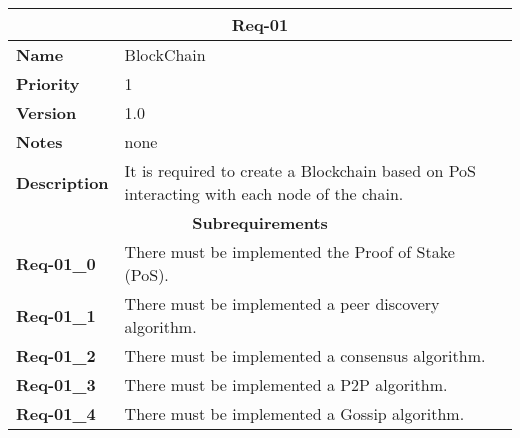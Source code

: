 \documentclass[../documentation.tex]{subfiles}
\begin{document}
\bgroup{}
\def\arraystretch{1.25}
\begin{center}
    \begin{tabular}{ |l|p{9cm}| }
        \hline
        \multicolumn{2}{|c|}{\textbf{Req-01}} \\
        \hline
        \textbf{Name} & BlockChain \\
        \hline
        \textbf{Priority} & 1 \\
        \hline
        \textbf{Version} & 1.0 \\
        \hline
        \textbf{Notes} & none \\
        \hline
        \textbf{Description} & It is required to create a Blockchain based on PoS interacting with each node of the chain. \\
        \hline
        \multicolumn{2}{|c|}{\textbf{Subrequirements}} \\
        \hline
        \textbf{Req-01\_0} & There must be implemented the Proof of Stake (PoS). \\
        \hline
        \textbf{Req-01\_1} & There must be implemented a peer discovery algorithm. \\
        \hline
        \textbf{Req-01\_2} & There must be implemented a consensus algorithm. \\
        \hline
        \textbf{Req-01\_3} & There must be implemented a P2P algorithm. \\
        \hline
        \textbf{Req-01\_4} & There must be implemented a Gossip algorithm. \\
        \hline
    \end{tabular}
\end{center}
\egroup{}
\end{document}
